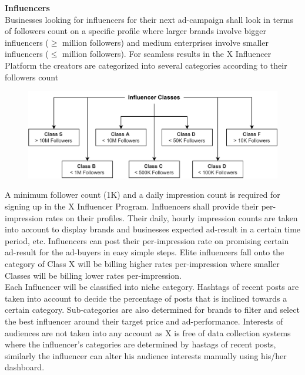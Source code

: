 \documentclass[letterpaper,11pt]{article}
\begin{document}
\textbf{Influencers}\\

Businesses looking for influencers for their next ad-campaign shall look in terms of followers count on a specific profile where larger brands involve bigger influencers ($\geq$ million followers) and medium enterprises involve smaller influencers ($\leq$ million followers). For seamless results in the X Influencer Platform the creators are categorized into several categories according to their followers count

\begin{figure}
\begin{center}
\includegraphics[width=12cm]{influencer-class}
\end{center}
\end{figure}

A minimum follower count (1K) and a daily impression count is required for signing up in the X Influencer Program. Influencers shall provide their per-impression rates on their profiles. Their daily, hourly impression counts are taken into account to display brands and businesses expected ad-result in a certain time period, etc. Influencers can post their per-impression rate on promising certain ad-result for the ad-buyers in easy simple steps. Elite influencers fall onto the category of Class X will be billing higher rates per-impression where smaller Classes will be billing lower rates per-impression. \\

Each Influencer will be classified into niche category. Hashtags of recent posts are taken into account to decide the percentage of posts that is inclined towards a certain category. Sub-categories are also determined for brands to filter and select the best influencer around their target price and ad-performance. Interests of audiences are not taken into any account as X is free of data collection systems where the influencer's categories are determined by hastags of recent posts, similarly the influencer can alter his audience interests manually using his/her dashboard.\\
\end{document}
